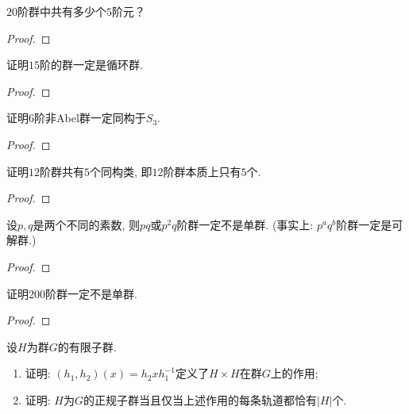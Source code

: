 \begin{problem}
    $20$阶群中共有多少个$5$阶元？
\end{problem}

\begin{proof}
    
\end{proof}

\begin{problem}
    证明$15$阶的群一定是循环群.
\end{problem}

\begin{proof}
    
\end{proof}

\begin{problem}
    证明$6$阶非Abel群一定同构于$S_3$.
\end{problem}

\begin{proof}
    
\end{proof}

\begin{problem}
    证明$12$阶群共有$5$个同构类, 即$12$阶群本质上只有$5$个.
\end{problem}

\begin{proof}
    
\end{proof}

\begin{problem}
    设$p, q$是两个不同的素数, 则$pq$或$p^2q$阶群一定不是单群. (事实上: $p^aq^b$阶群一定是可解群.)
\end{problem}

\begin{proof}
    
\end{proof}

\begin{problem}
    证明$200$阶群一定不是单群.
\end{problem}

\begin{proof}
    
\end{proof}

\begin{problem}
    设$H$为群$G$的有限子群.
    \begin{enumerate}[(1)]
        \item 证明: $(h_1, h_2)(x) = h_2xh_1^{-1}$定义了$H \times H$在群$G$上的作用;
        \item 证明: $H$为$G$的正规子群当且仅当上述作用的每条轨道都恰有$|H|$个.
    \end{enumerate}
\end{problem}

